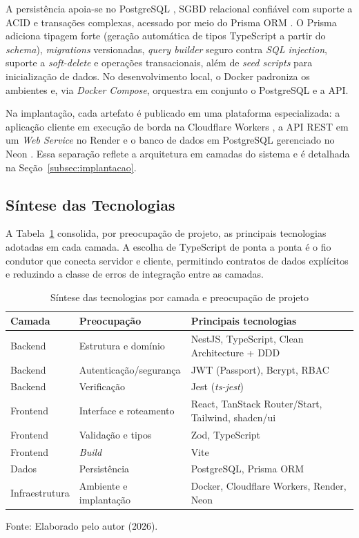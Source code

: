 \documentclass[12pt,openright,oneside,a4paper]{article}
\newcommand{\fonte}[1]{{\par\vspace{0.25em}\centering\footnotesize Fonte: #1.\par}}
\begin{document}
A persistência apoia-se no PostgreSQL \cite{postgresql}, SGBD relacional confiável com suporte a ACID e transações complexas, acessado por meio do Prisma ORM \cite{prisma}. O Prisma adiciona tipagem forte (geração automática de tipos TypeScript a partir do \textit{schema}), \textit{migrations} versionadas, \textit{query builder} seguro contra \textit{SQL injection}, suporte a \textit{soft-delete} e operações transacionais, além de \textit{seed scripts} para inicialização de dados. No desenvolvimento local, o Docker \cite{docker} padroniza os ambientes e, via \textit{Docker Compose}, orquestra em conjunto o PostgreSQL e a API.

Na implantação, cada artefato é publicado em uma plataforma especializada: a aplicação cliente em execução de borda na Cloudflare Workers \cite{cloudflareworkers}, a API REST em um \textit{Web Service} no Render \cite{render} e o banco de dados em PostgreSQL gerenciado no Neon \cite{neon}. Essa separação reflete a arquitetura em camadas do sistema e é detalhada na Seção~\ref{subsec:implantacao}.

\subsection{Síntese das Tecnologias}

A Tabela~\ref{tab:sintese_tecnologias} consolida, por preocupação de projeto, as principais tecnologias adotadas em cada camada. A escolha de TypeScript de ponta a ponta é o fio condutor que conecta servidor e cliente, permitindo contratos de dados explícitos e reduzindo a classe de erros de integração entre as camadas.

\begin{table}[H]
\centering
\caption{Síntese das tecnologias por camada e preocupação de projeto}
\label{tab:sintese_tecnologias}
\begin{tabularx}{\textwidth}{l l X}
\toprule
\textbf{Camada} & \textbf{Preocupação} & \textbf{Principais tecnologias} \\
\midrule
Backend       & Estrutura e domínio      & NestJS, TypeScript, Clean Architecture + DDD \\
Backend       & Autenticação/segurança   & JWT (Passport), Bcrypt, RBAC \\
Backend       & Verificação              & Jest (\textit{ts-jest}) \\
Frontend      & Interface e roteamento   & React, TanStack Router/Start, Tailwind, shadcn/ui \\
Frontend      & Validação e tipos        & Zod, TypeScript \\
Frontend      & \textit{Build}           & Vite \\
Dados         & Persistência             & PostgreSQL, Prisma ORM \\
Infraestrutura & Ambiente e implantação  & Docker, Cloudflare Workers, Render, Neon \\
\bottomrule
\end{tabularx}
\fonte{Elaborado pelo autor (2026)}
\end{table}
\end{document}
